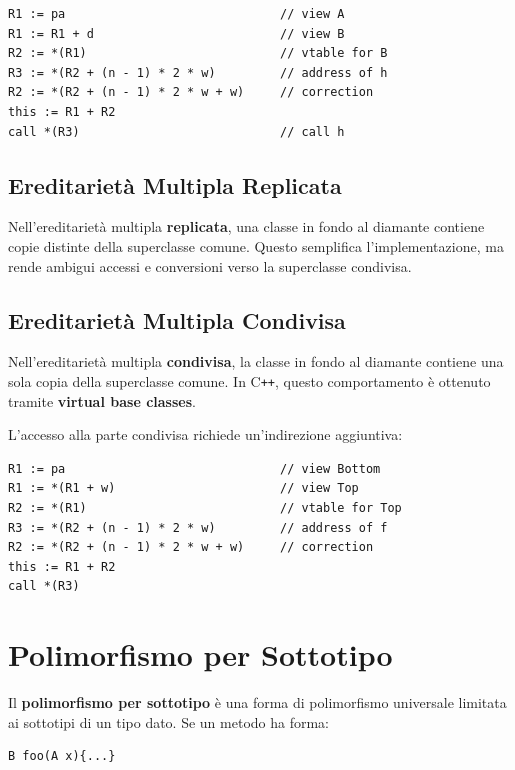 \documentclass{article}
\begin{document}
\begin{lstlisting}
R1 := pa                              // view A
R1 := R1 + d                          // view B
R2 := *(R1)                           // vtable for B
R3 := *(R2 + (n - 1) * 2 * w)         // address of h
R2 := *(R2 + (n - 1) * 2 * w + w)     // correction
this := R1 + R2
call *(R3)                            // call h
\end{lstlisting}

\subsection{Ereditarietà Multipla Replicata}

Nell'ereditarietà multipla \textbf{replicata}, una classe in fondo al diamante contiene copie distinte della superclasse comune. Questo semplifica l'implementazione, ma rende ambigui accessi e conversioni verso la superclasse condivisa.

\subsection{Ereditarietà Multipla Condivisa}

Nell'ereditarietà multipla \textbf{condivisa}, la classe in fondo al diamante contiene una sola copia della superclasse comune. In C\texttt{++}, questo comportamento è ottenuto tramite \textbf{virtual base classes}.

L'accesso alla parte condivisa richiede un'indirezione aggiuntiva:

\begin{lstlisting}
R1 := pa                              // view Bottom
R1 := *(R1 + w)                       // view Top
R2 := *(R1)                           // vtable for Top
R3 := *(R2 + (n - 1) * 2 * w)         // address of f
R2 := *(R2 + (n - 1) * 2 * w + w)     // correction
this := R1 + R2
call *(R3)
\end{lstlisting}

\section{Polimorfismo per Sottotipo}

Il \textbf{polimorfismo per sottotipo} è una forma di polimorfismo universale limitata ai sottotipi di un tipo dato. Se un metodo ha forma:

\begin{lstlisting}
B foo(A x){...}
\end{lstlisting}
\end{document}
